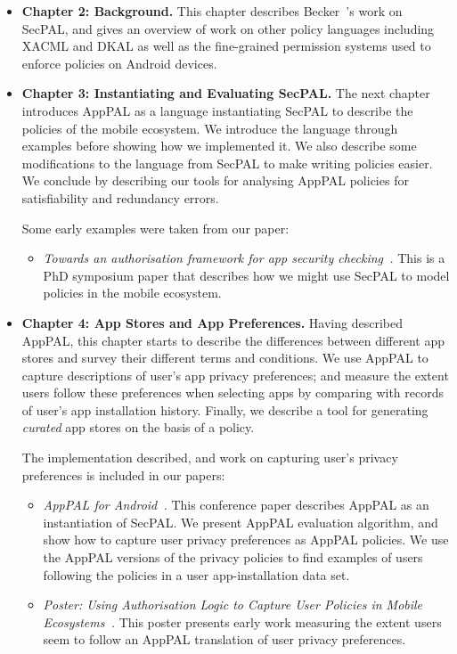 \documentclass[thesis.tex]{subfiles}
\begin{document}
\begin{itemize}
\item \textbf{Chapter 2: Background.}  This chapter describes
  Becker~\etal's work on SecPAL, and gives an overview of work on other
  policy languages including XACML and DKAL as well as the fine-grained
  permission systems used to enforce policies on Android devices.

\item \textbf{Chapter 3: Instantiating and Evaluating SecPAL.}  The
  next chapter introduces AppPAL as a language instantiating SecPAL to
  describe the policies of the mobile ecosystem. We introduce the
  language through examples before showing how we implemented it. We
  also describe some modifications to the language from SecPAL to make
  writing policies easier. We conclude by describing our tools for
  analysing AppPAL policies for satisfiability and redundancy errors.
  
  Some early examples were taken from our paper:
  \begin{itemize}
  \item\emph{Towards an authorisation framework for app security
      checking~\cite{hallett_towards_2014}.} This is a PhD symposium paper that describes how
    we might use SecPAL to model policies in the mobile ecosystem.
  \end{itemize}

\item \textbf{Chapter 4: App Stores and App Preferences.} 
  Having described AppPAL, this chapter starts to describe the differences between different
  app stores and survey their different terms and conditions. We use AppPAL to
  capture descriptions of user's app privacy preferences; and measure the extent
  users follow these preferences when selecting apps by comparing with records of
  user's app installation history. Finally, we describe a tool for generating
  \emph{curated} app stores on the basis of a policy.
  
  The implementation described, and work on capturing user's privacy preferences is included in our papers:
  \begin{itemize}
  \item\emph{AppPAL for Android~\cite{hallett_apppal_2016}.} This
    conference paper describes AppPAL as an instantiation of SecPAL.  We
    present AppPAL evaluation algorithm, and show how to capture user
    privacy preferences as AppPAL policies. We use the AppPAL versions of
    the privacy policies to find examples of users following the policies
    in a user app-installation data set.
  \item\emph{Poster: Using Authorisation Logic to Capture User
      Policies in Mobile Ecosystems~\cite{hallett_poster:_2015}.}  This
    poster presents early work measuring the extent users seem to follow
    an AppPAL translation of user privacy preferences.
  \end{itemize}


\end{itemize}
\end{document}
